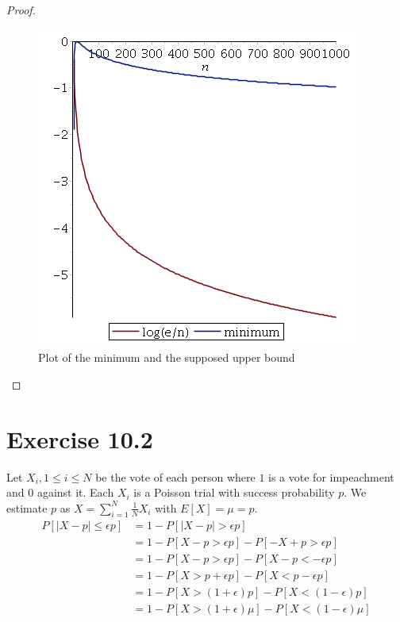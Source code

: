 \documentclass[10pt,a4paper]{article}
\begin{document}
\begin{proof}
  \begin{figure}
    \centering
    \includegraphics{sheet-10/exercise-10-1}
    \caption{Plot of the minimum and the supposed upper bound}
    \label{fig:exercise-10-1}
  \end{figure}
\end{proof}

\section*{Exercise 10.2}

Let $X_{i}, 1 \le i \le N$ be the vote of each person where $1$ is a vote for impeachment and $0$ against it.
Each $X_{i}$ is a Poisson trial with success probability $p$.
We estimate $p$ as $X = \sum_{i = 1}^{N} \frac{1}{N} X_{i}$ with $E[X] = \mu = p$.
\begin{align*}
  P[|X - p| \le \epsilon p] & = 1 - P[|X - p| > \epsilon p]\\
                            & = 1 - P[X - p > \epsilon p] - P[-X + p > \epsilon p]\\
                            & = 1 - P[X - p > \epsilon p] - P[X - p < -\epsilon p]\\
                            & = 1 - P[X > p + \epsilon p] - P[X < p - \epsilon p]\\
                            & = 1 - P[X > (1 + \epsilon)p] - P[X < (1 - \epsilon)p]\\
                            & = 1 - P[X > (1 + \epsilon)\mu] - P[X < (1 - \epsilon)\mu]
\end{align*}
\end{document}
